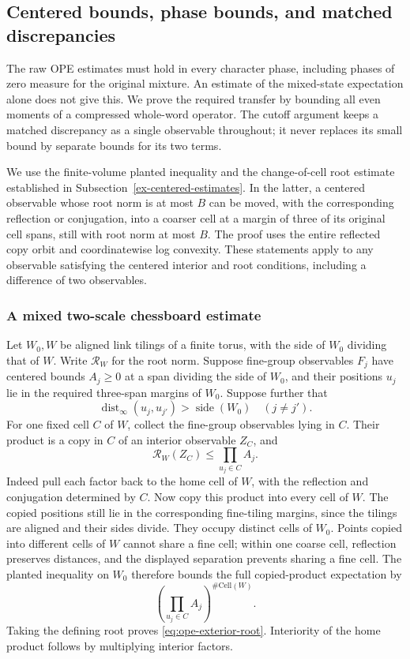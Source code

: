 \subsection{Centered bounds, phase bounds, and matched discrepancies}
\label{sec:ope-phase-prices}
The raw OPE estimates must hold in every character phase, including phases
of zero measure for the original mixture. An estimate of the mixed-state
expectation alone does not give this. We prove the required transfer by
bounding all even moments of a compressed whole-word operator. The cutoff
argument keeps a matched discrepancy as a single observable throughout;
it never replaces its small bound by separate bounds for its two terms.

We use the finite-volume planted inequality and the change-of-cell root
estimate established in Subsection~\ref{ex-centered-estimates}. In the latter,
a centered observable whose root norm is at most $B$ can be moved, with
the corresponding reflection or conjugation, into a coarser cell at a
margin of three of its original cell spans, still with root norm at most
$B$. The proof uses the entire reflected copy orbit and coordinatewise
log convexity. These statements apply to any observable satisfying the
centered interior and root conditions, including a difference of two
observables.

\subsubsection{A mixed two-scale chessboard estimate}
Let $W_0,W$ be aligned link tilings of a finite torus, with the side of
$W_0$ dividing that of $W$. Write $\mathcal R_W$ for the root norm.
Suppose fine-group observables $F_j$ have centered bounds $A_j\geq0$
at a span dividing the side of $W_0$, and their positions $u_j$ lie in
the required three-span margins of $W_0$. Suppose further that
\[
 \operatorname{dist}_\infty(u_j,u_{j'})>\operatorname{side}(W_0)
                  \quad(j\ne j').
\]
For one fixed cell $C$ of $W$, collect the fine-group observables lying
in $C$. Their product is a copy in $C$ of an interior observable $Z_C$,
and
\begin{equation}\label{eq:ope-exterior-root}
 \mathcal R_W(Z_C)\leq\prod_{u_j\in C}A_j.
\end{equation}
Indeed pull each factor back to the home cell of $W$, with the reflection
and conjugation determined by $C$. Now copy this product into every cell
of $W$. The copied positions still lie in the corresponding fine-tiling
margins, since the tilings are aligned and their sides divide. They occupy
distinct cells of $W_0$. Points copied into different cells of $W$ cannot
share a fine cell; within one coarse cell, reflection preserves distances,
and the displayed separation prevents sharing a fine cell. The planted
inequality on $W_0$ therefore bounds the full copied-product expectation
by
\[
 \left(\prod_{u_j\in C}A_j\right)^{\#\mathrm{Cell}(W)}.
\]
Taking the defining root proves \eqref{eq:ope-exterior-root}. Interiority
of the home product follows by multiplying interior factors.


